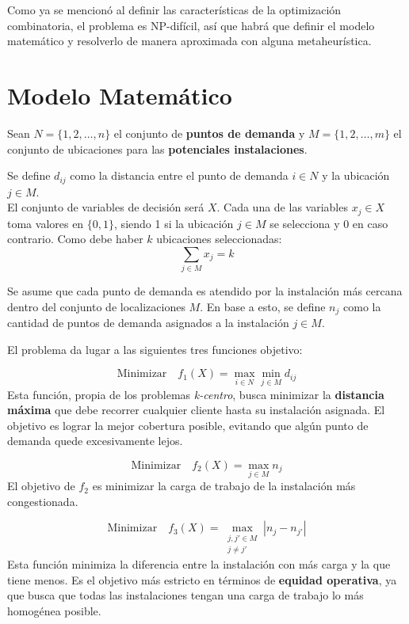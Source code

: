 \documentclass[12pt,a4paper]{book}
\begin{document}
Como ya se mencionó al definir las características de la optimización combinatoria, el problema es NP-difícil, así
que habrá que definir el modelo matemático y resolverlo de manera aproximada con alguna metaheurística.
\section{Modelo Matemático}
Sean $N=\{1, 2, \dots, n\}$ el conjunto de \textbf{puntos de demanda} y $M=\{1, 2, \dots, m\}$ el conjunto de ubicaciones para las \textbf{potenciales instalaciones}.

Se define $d_{ij}$ como la distancia entre el punto de demanda $i \in N$ y la ubicación $j \in M$.\\
El conjunto de variables de decisión será $X$. Cada una de las variables $x_j \in X$ toma valores en $\{0,1\}$, siendo 1 si la ubicación $j \in M$ se selecciona y 0 en caso contrario. Como debe haber $k$ ubicaciones seleccionadas:
\begin{equation}
    \sum_{j \in M} x_j = k
\end{equation}

Se asume que cada punto de demanda es atendido por la instalación más cercana dentro del conjunto de localizaciones $M$. En base a esto, se define $n_j$ como la cantidad de puntos de demanda asignados a la instalación $j \in M$.

El problema da lugar a las siguientes tres funciones objetivo:

\begin{equation}
    \text{Minimizar} \quad f_1(X) = \max_{i \in N} \min_{j \in M} d_{ij}
\end{equation}
Esta función, propia de los problemas \textit{k-centro}, busca minimizar la \textbf{distancia máxima} que debe recorrer cualquier cliente hasta su instalación asignada. El objetivo es lograr la mejor cobertura posible, evitando que algún punto de demanda quede excesivamente lejos.

\begin{equation}
    \text{Minimizar} \quad f_2(X) = \max_{j \in M} n_j
\end{equation}
El objetivo de $f_2$ es minimizar la carga de trabajo de la instalación más congestionada. 

\begin{equation}
    \text{Minimizar} \quad f_3(X) = \max_{\substack{j, j' \in M \\ j \neq j'}} |n_j - n_{j'}|
\end{equation}
Esta función minimiza la diferencia entre la instalación con más carga y la que tiene menos. Es el objetivo más estricto en términos de \textbf{equidad operativa}, ya que busca que todas las instalaciones tengan una carga de trabajo lo más homogénea posible.
\end{document}
